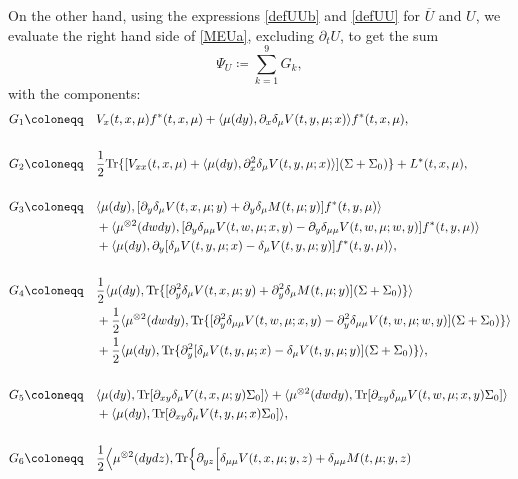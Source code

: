 \documentclass{amsart}
\theoremstyle{definition}
\theoremstyle{remark}
\numberwithin{equation}{section}
\begin{document}
On the other hand,
using the expressions  \eqref{defUUb} and \eqref{defUU} for  $\overline U$  and $U$,
we evaluate the right hand side of \eqref{MEUa}, excluding $\partial_t U$,
to get the sum
$$
\Psi_U\coloneqq \sum_{k=1}^9 G_k,
$$
with the components:
{\allowdisplaybreaks
\begin{align*}
G_1 \coloneqq \quad   & V_x(t,x, \mu) f^*(t,x,\mu) + \langle \mu(dy),  \partial_x \delta_\mu V(t, y,\mu; x)      \rangle f^*(t,x,\mu), \\
&  \\
G_2 \coloneqq \quad  &\frac12 \mbox{Tr}\{[  V_{xx}(t,x, \mu)+ \langle \mu(dy),   \partial_x^2\delta_\mu V(t, y,\mu; x)      \rangle] (\Sigma+\Sigma_0)\}+L^*(t, x, \mu),\\
& \\
G_3 \coloneqq  \quad & \langle \mu(dy), [ \partial_y \delta_\mu V(t, x, \mu;y) + \partial_y\delta_\mu M(t, \mu;y)] f^*(t,y,\mu)\rangle\\
&+ \langle \mu^{\otimes2}(dwdy), [ \partial_y\delta_{\mu\mu}  V(t, w,\mu; x,y)-\partial_y \delta_{\mu\mu}  V(t, w,\mu; w,y) ] f^*(t,y,\mu)\rangle  \\
&+\langle \mu(dy), \partial_{y}[    \delta_\mu  V(t, y,\mu; x)- \delta_\mu  V(t, y,\mu; y)  ] f^*(t,y,\mu)\rangle, \\
& \\
G_4 \coloneqq  \quad &  \frac12\langle \mu(dy),\mbox{Tr} \{[ \partial_y^2 \delta_\mu V(t, x, \mu;y) + \partial_y^2\delta_\mu M(t, \mu;y)] (\Sigma+\Sigma_0)\}\rangle\\
&+ \frac12\langle \mu^{\otimes2}(dwdy),\mbox{Tr}\{ [ \partial_y^2\delta_{\mu\mu}  V(t, w,\mu; x,y)-\partial_y^2 \delta_{\mu\mu}  V(t, w,\mu; w,y) ] (\Sigma+\Sigma_0)\}
 \rangle  \\
&+\frac12\langle \mu(dy),\mbox{Tr}\{ \partial_{y}^2[    \delta_\mu  V(t, y,\mu; x)- \delta_\mu  V(t, y,\mu; y)  ] (\Sigma+\Sigma_0)\} \rangle,\\
& \\
G_5 \coloneqq \quad & \langle \mu(dy),\mbox{Tr} [ \partial_{xy} \delta_\mu V(t, x, \mu;y)  \Sigma_0]\rangle %
+ \langle \mu^{\otimes2}(dwdy),\mbox{Tr} [ \partial_{xy}\delta_{\mu\mu}  V(t, w,\mu; x,y) \Sigma_0] \rangle  \\
&+\langle \mu(dy),\mbox{Tr}[ \partial_{xy}    \delta_\mu  V(t, y,\mu; x)\Sigma_0] \rangle, \\
&\\
G_6 \coloneqq  \quad &  \frac12\Big\langle\mu^{\otimes2}(dydz), {\rm Tr}\Big\{  \partial_{yz}\Big[  \delta_{\mu\mu} V(t, x, \mu;y,z) + \delta_{\mu\mu} M(t, \mu;y,z)\\

\end{align*}}
\end{document}
